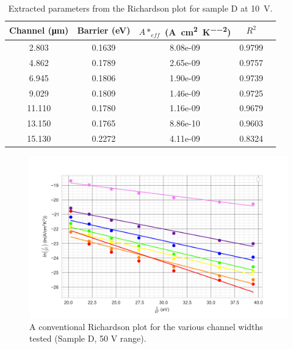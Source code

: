 \begin{refsection}
\begin{table}[h]
    \centering
    \begin{tabular}{|c|c|c|c|c|}
        \hline
        Channel (\si{\micro\metre}) & Barrier (\si{\electronvolt})  & $A*_{eff}$ (\si{\ampere\per\centi\metre\squared\per\kelvin\squared}) & $R^{2}$\\ \hline
        2.803 & 0.1639  & 8.08e-09 &0.9799 \\ 
        4.862 & 0.1789 & 2.65e-09 &0.9757 \\ 
        6.945 & 0.1806  & 1.90e-09 &0.9739 \\ 
        9.029 & 0.1809 & 1.46e-09 &0.9725 \\ 
        11.110 & 0.1780  & 1.16e-09 &0.9679 \\ 
        13.150 & 0.1765  & 8.86e-10 &0.9603 \\ 
        15.130 & 0.2272  & 4.11e-09 &0.8324 \\ 
        \hline
    \end{tabular}
    \caption{Extracted parameters from the Richardson plot for sample D at 10~\si{\volt}.}
    \label{tab:richardsonD_10V}
\end{table}

\begin{figure}[h]
    \centering
    \includegraphics[width=\textwidth]{Chapter3/Figs/Raster/Sample D 2019/newRichardson_Plot_50V.png}
    \caption{A conventional Richardson plot for the various channel widths tested (Sample D, 50 V range).}
    \label{fig:richardsonD_50V}
\end{figure}


\end{refsection}
